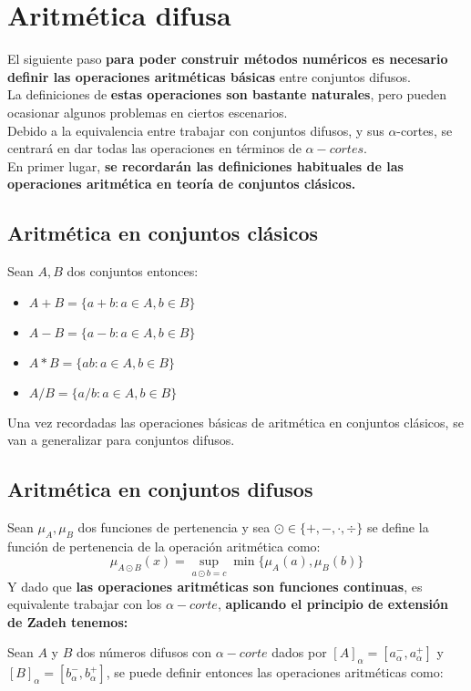   \section{Aritmética difusa}
  El siguiente paso \textbf{para poder construir métodos numéricos es necesario definir las operaciones aritméticas básicas} entre conjuntos difusos.\\
  La definiciones de \textbf{estas operaciones son bastante naturales}, pero pueden ocasionar algunos problemas en ciertos escenarios.\\
  Debido a la equivalencia entre trabajar con conjuntos difusos, y sus $\alpha$-cortes, se centrará en dar todas las operaciones en términos de $\alpha-cortes$.\\
  En primer lugar, \textbf{se recordarán las definiciones habituales de las operaciones aritmética en teoría de conjuntos clásicos.}

  \subsection{Aritmética en conjuntos clásicos}
  Sean $A, B$ dos conjuntos entonces:
  \begin{itemize}
  \item $A+B=\{a+b : a \in A, b\in B\}$
  \item $A - B =\{a - b : a \in A, b\in B\}$
  \item $A * B =\{ab : a \in A, b\in B\}$
  \item $A / B =\{a/b : a \in A, b\in B\}$
  \end{itemize}

  Una vez recordadas las operaciones básicas de aritmética en conjuntos clásicos, se van a generalizar para conjuntos difusos.

  \subsection{Aritmética en conjuntos difusos}
  Sean $\mu_A, \mu_B$ dos funciones de pertenencia y sea $\odot \in \{+, -, \cdot, \div\}$ se define la función de pertenencia de la operación aritmética como:
  $$
  \mu_{A \odot B}(x) = \sup_{a \odot b = c} \min\{\mu_A(a), \mu_B(b)\}
  $$
  Y dado que \textbf{las operaciones aritméticas son funciones continuas}, es equivalente trabajar con los $\alpha-corte$, \textbf{aplicando el principio de extensión de Zadeh tenemos:}

  Sean $A$ y $B$ dos números difusos con $\alpha-corte$ dados por $[A]_\alpha=[a_\alpha^-, a_\alpha^+]$ y $[B]_\alpha=[b_\alpha^-, b_\alpha^+]$, se puede definir entonces las operaciones aritméticas como:

